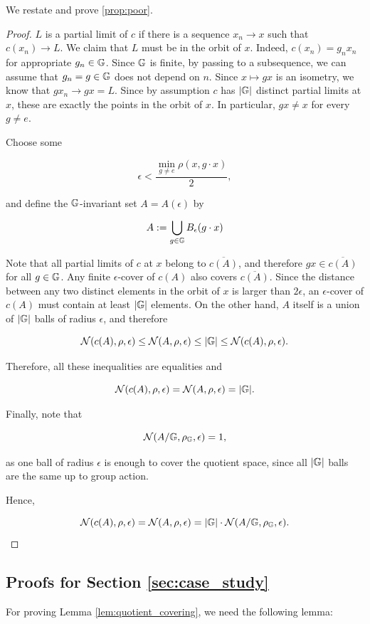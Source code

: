 \documentclass{article}
\begin{document}
We restate and prove \ref{prop:poor}.
\poorcanonization*
\begin{proof}
\label{poor_proof}
$L$ is a partial limit of $c$ if there is a sequence $x_n \rightarrow x$ such that $c(x_n)\rightarrow L$. We claim that $L$ must be in the orbit of $x$. Indeed, $c(x_n)=g_nx_n$ for appropriate $g_n \in \mathbb{G}$. Since $\mathbb{G}$ is finite, by passing to a subsequence, we can assume that $g_n=g\in \mathbb{G}$ does not depend on $n$. Since $x\mapsto gx$ is an isometry, we know that $gx_n \rightarrow gx=L$. Since by assumption $c$ has $|\mathbb{G}|$ distinct partial limits at $x$, these are exactly the points in the orbit of $x$. In particular, $gx\neq x$ for every $g\neq e$.

Choose some

$$
\epsilon < \frac{\min_{g \neq e} \rho(x,g\cdot x)}{2},
$$

and define the $\mathbb{G}$-invariant set $A=A(\epsilon)$ by

$$
A := \bigcup_{g \in \mathbb{G}} B_{\epsilon}(g\cdot x)
$$

Note that all partial limits of $c$ at $x$ belong to $\overline{c(A)}$, and therefore $gx\in \overline{c(A)}$ for all $g\in \mathbb{G}$. Any finite $\epsilon$-cover of $c(A)$ also covers $\overline{c(A)}$. Since the distance between any two distinct elements in the orbit of $x$ is larger than $2\epsilon$, an $\epsilon$-cover of $c(A)$ must contain at least $|\mathbb{G}|$ elements. On the other hand, $A$ itself is a union of $|\mathbb{G}|$ balls of radius $\epsilon$, and therefore

$$
\mathcal{N}(c(A),\rho,\epsilon)\leq \mathcal{N}(A,\rho,\epsilon)\leq |\mathbb{G}|
\leq \mathcal{N}(c(A),\rho,\epsilon).
$$

Therefore, all these inequalities are equalities and

$$
\mathcal{N}(c(A),\rho,\epsilon)=\mathcal{N}(A,\rho,\epsilon)=|\mathbb{G}|.
$$

Finally, note that

$$
\mathcal{N}(A/\mathbb{G},\rho_{\mathbb{G}},\epsilon)=1,
$$

as one ball of radius $\epsilon$ is enough to cover the quotient space, since all $|\mathbb{G}|$ balls are the same up to group action.

Hence,

$$
\mathcal{N}(c(A),\rho,\epsilon)
=
\mathcal{N}(A,\rho,\epsilon)
=
|\mathbb{G}|\cdot \mathcal{N}(A/\mathbb{G},\rho_{\mathbb{G}},\epsilon).
$$

\end{proof}

\subsection{Proofs for Section \ref{sec:case_study}}
For proving Lemma \ref{lem:quotient_covering}, we need the following lemma: 
\end{document}
